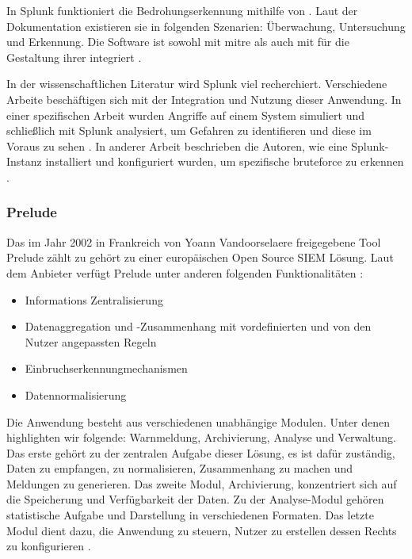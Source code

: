 In Splunk funktioniert die Bedrohungserkennung mithilfe von . Laut der Dokumentation existieren sie in folgenden Szenarien: Überwachung, Untersuchung und Erkennung. Die Software ist sowohl mit \gls{mitre} als auch mit  für die Gestaltung ihrer  integriert \citep{Splunk_usecases}. 

In der wissenschaftlichen Literatur wird Splunk viel recherchiert. Verschiedene Arbeite beschäftigen sich mit der Integration und Nutzung dieser Anwendung. In einer spezifischen Arbeit wurden Angriffe auf einem System simuliert und schließlich mit Splunk analysiert, um Gefahren zu identifieren und diese im Voraus zu sehen \citep{Su_SplunkDDOS}. In anderer Arbeit beschrieben die Autoren, wie eine Splunk-Instanz installiert und konfiguriert wurden, um spezifische \gls{bruteforce} zu erkennen \citep{Selvaganesh_SplunkBruteForce}.       





\subsubsection{Prelude}
Das im Jahr 2002 in Frankreich von Yoann Vandoorselaere freigegebene Tool Prelude zählt zu gehört zu einer europäischen \gls{Open Source} \gls{SIEM} Lösung. Laut dem Anbieter verfügt Prelude unter anderen folgenden Funktionalitäten \citep{Prelude_SIEM}:

\begin{itemize}[noitemsep]
   \item Informations Zentralisierung 
   \item Datenaggregation und -Zusammenhang mit vordefinierten und von den Nutzer angepassten Regeln 
   \item Einbruchserkennungmechanismen
   \item Datennormalisierung
\end{itemize}

Die Anwendung besteht aus verschiedenen unabhängige Modulen. Unter denen highlighten wir folgende: Warnmeldung, Archivierung, Analyse und Verwaltung. Das erste gehört zu der zentralen Aufgabe dieser Lösung, es ist dafür zuständig, Daten zu empfangen, zu normalisieren, Zusammenhang zu machen und Meldungen zu generieren. Das zweite Modul, Archivierung, konzentriert sich auf die Speicherung und Verfügbarkeit der Daten. Zu der Analyse-Modul gehören statistische Aufgabe und Darstellung in verschiedenen Formaten. Das letzte Modul dient dazu, die Anwendung zu steuern, Nutzer zu erstellen dessen Rechts zu konfigurieren \citep{EC_Prelude}.

